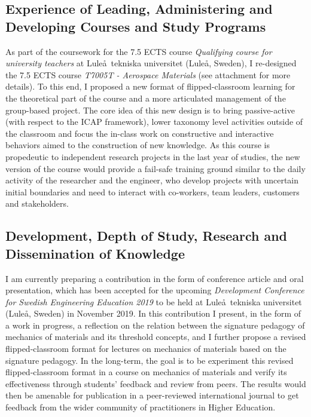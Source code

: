 \documentclass[
  a4paper, 
]{fortysecondscv}
\begin{document}
\subsection{Experience of Leading, Administering and Developing Courses and Study Programs}
As part of the coursework for the 7.5 ECTS course \emph{Qualifying course for university teachers} at Lule\aa\ tekniska universitet (Lule\aa, Sweden), I re-designed the 7.5 ECTS course \textit{T7005T - Aerospace Materials} (see attachment for more details). To this end, I proposed a new format of flipped-classroom learning for the theoretical part of the course and a more articulated management of the group-based project. The core idea of this new design is to bring passive-active (with respect to the ICAP framework), lower taxonomy level activities outside of the classroom and focus the in-class work on constructive and interactive behaviors aimed to the construction of new knowledge. As this course is propedeutic to independent research projects in the last year of studies, the new version of the course would provide a fail-safe training ground similar to the daily activity of the researcher and the engineer, who develop projects with uncertain initial boundaries and need to interact with co-workers, team leaders, customers and stakeholders.

\subsection{Development, Depth of Study, Research and Dissemination of Knowledge}
I am currently preparing a contribution in the form of conference article and oral presentation, which has been accepted for the upcoming \textit{Development Conference for Swedish Engineering Education 2019} to be held at Lule\aa\ tekniska universitet (Lule\aa, Sweden) in November 2019. In this contribution I present, in the form of a work in progress, a reflection on the relation between the signature pedagogy of mechanics of materials and its threshold concepts, and I further propose a revised flipped-classroom format for lectures on mechanics of materials based on the signature pedagogy. In the long-term, the goal is to be experiment this revised flipped-classroom format in a course on mechanics of materials and verify its effectiveness through students' feedback and review from peers. The results would then be amenable for publication in a peer-reviewed international journal to get feedback from the wider community of practitioners in Higher Education.
\end{document}

